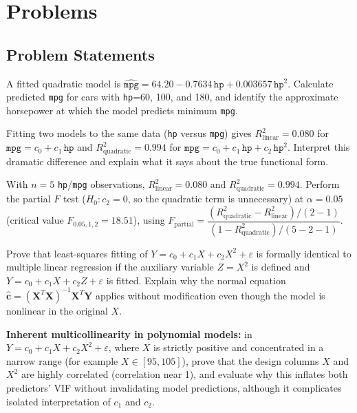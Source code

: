 \section*{Problems}

\subsection*{Problem Statements}

\begin{problema}
\label{prob:85eb17b}
A fitted quadratic model is $\hat{\texttt{mpg}}=64.20-0.7634\,\texttt{hp}+0.003657\,\texttt{hp}^2$. Calculate predicted \texttt{mpg} for cars with \texttt{hp}=60, 100, and 180, and identify the approximate horsepower at which the model predicts minimum \texttt{mpg}.
\end{problema}

\begin{problema}
\label{prob:5afaae8}
Fitting two models to the same data (\texttt{hp} versus \texttt{mpg}) gives $R^2_{\text{linear}}=0.080$ for $\texttt{mpg}=c_0+c_1\,\texttt{hp}$ and $R^2_{\text{quadratic}}=0.994$ for $\texttt{mpg}=c_0+c_1\,\texttt{hp}+c_2\,\texttt{hp}^2$. Interpret this dramatic difference and explain what it says about the true functional form.
\end{problema}

\begin{problema}
\label{prob:e757ebc}
With $n=5$ \texttt{hp}/\texttt{mpg} observations, $R^2_{\text{linear}}=0.080$ and $R^2_{\text{quadratic}}=0.994$. Perform the partial $F$ test ($H_0:c_2=0$, so the quadratic term is unnecessary) at $\alpha=0.05$ (critical value $F_{0.05,1,2}=18.51$), using $F_{\text{partial}}=\dfrac{(R^2_{\text{quadratic}}-R^2_{\text{linear}})/(2-1)}{(1-R^2_{\text{quadratic}})/(5-2-1)}$.
\end{problema}

\begin{problema}
\label{prob:c772cd1}
Prove that least-squares fitting of $Y=c_0+c_1X+c_2X^2+\varepsilon$ is formally identical to multiple linear regression if the auxiliary variable $Z=X^2$ is defined and $Y=c_0+c_1X+c_2Z+\varepsilon$ is fitted. Explain why the normal equation $\hat{\mathbf c}=(\mathbf X^T\mathbf X)^{-1}\mathbf X^T\mathbf Y$ applies without modification even though the model is nonlinear in the original $X$.
\end{problema}

\begin{problema}
\label{prob:6954b16}
\textbf{Inherent multicollinearity in polynomial models:} in $Y=c_0+c_1X+c_2X^2+\varepsilon$, where $X$ is strictly positive and concentrated in a narrow range (for example $X\in[95,105]$), prove that the design columns $X$ and $X^2$ are highly correlated (correlation near 1), and evaluate why this inflates both predictors' VIF without invalidating model predictions, although it complicates isolated interpretation of $c_1$ and $c_2$.
\end{problema}

